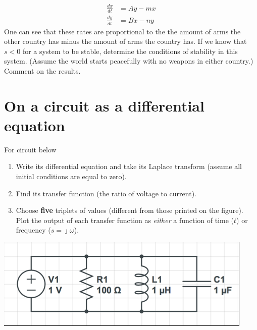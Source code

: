 \documentclass[11pt]{book}
\begin{document}
\begin{align}
	\frac{dx}{dt} &= Ay - mx \\
	\frac{dy}{dt} &= Bx - ny
\end{align}
One can see that these rates are proportional to the the amount of arms the other country has minus the amount of arms the country has. If we know that $s < 0$ for a system to be stable, determine the conditions of stability in this system. (Assume the world starts peacefully with no weapons in either country.) Comment on the results. 

\newpage

\section{On a circuit as a differential equation}
For circuit below
\begin{enumerate}
	\item Write its differential equation and take its Laplace transform (assume all initial conditions are equal to zero). 
	\item Find its transfer function (the ratio of voltage to current).
	\item  Choose \textbf{five} triplets of values (different from those printed on the figure). Plot the output of each transfer function as \textit{either} a function of time ($t$) or frequency ($s = \jmath \omega $).
\end{enumerate} 


\begin{center}
	\includegraphics{figures/hw3.01.png}
\end{center}

\newpage
\end{document}

